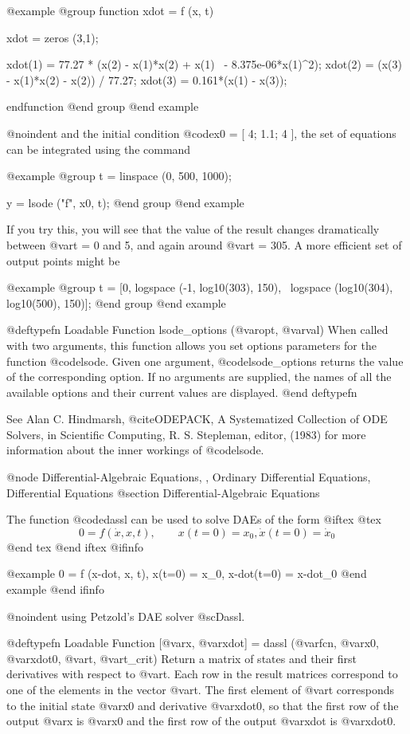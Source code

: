 @example
@group
function xdot = f (x, t)

  xdot = zeros (3,1);

  xdot(1) = 77.27 * (x(2) - x(1)*x(2) + x(1) \
            - 8.375e-06*x(1)^2);
  xdot(2) = (x(3) - x(1)*x(2) - x(2)) / 77.27;
  xdot(3) = 0.161*(x(1) - x(3));

endfunction
@end group
@end example

@noindent
and the initial condition @code{x0 = [ 4; 1.1; 4 ]}, the set of
equations can be integrated using the command

@example
@group
t = linspace (0, 500, 1000);

y = lsode ("f", x0, t);
@end group
@end example

If you try this, you will see that the value of the result changes
dramatically between @var{t} = 0 and 5, and again around @var{t} = 305.
A more efficient set of output points might be

@example
@group
t = [0, logspace (-1, log10(303), 150), \
        logspace (log10(304), log10(500), 150)];
@end group
@end example

@deftypefn {Loadable Function} {} lsode_options (@var{opt}, @var{val})
When called with two arguments, this function allows you set options
parameters for the function @code{lsode}.  Given one argument,
@code{lsode_options} returns the value of the corresponding option.  If
no arguments are supplied, the names of all the available options and
their current values are displayed.
@end deftypefn

See Alan C. Hindmarsh, @cite{ODEPACK, A Systematized Collection of ODE
Solvers}, in Scientific Computing, R. S. Stepleman, editor, (1983) for
more information about the inner workings of @code{lsode}.

@node Differential-Algebraic Equations,  , Ordinary Differential Equations, Differential Equations
@section Differential-Algebraic Equations

The function @code{dassl} can be used to solve DAEs of the form
@iftex
@tex
$$
 0 = f (\dot{x}, x, t), \qquad x(t=0) = x_0, \dot{x}(t=0) = \dot{x}_0
$$
@end tex
@end iftex
@ifinfo

@example
0 = f (x-dot, x, t),    x(t=0) = x_0, x-dot(t=0) = x-dot_0
@end example
@end ifinfo

@noindent
using Petzold's DAE solver @sc{Dassl}.

@deftypefn {Loadable Function} {[@var{x}, @var{xdot}] =} dassl (@var{fcn}, @var{x0}, @var{xdot0}, @var{t}, @var{t_crit})
Return a matrix of states and their first derivatives with respect to
@var{t}.  Each row in the result matrices correspond to one of the
elements in the vector @var{t}.  The first element of @var{t}
corresponds to the initial state @var{x0} and derivative @var{xdot0}, so
that the first row of the output @var{x} is @var{x0} and the first row
of the output @var{xdot} is @var{xdot0}.

